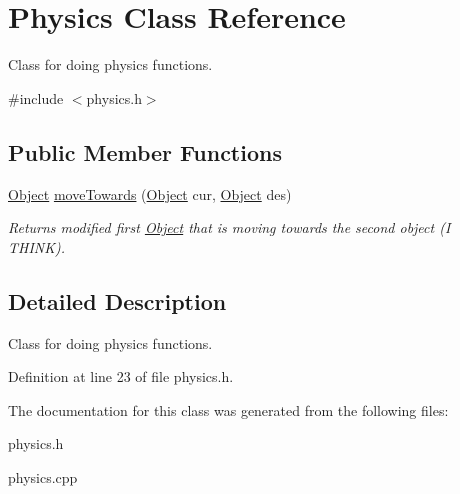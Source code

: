 \hypertarget{classPhysics}{}\section{Physics Class Reference}
\label{classPhysics}


Class for doing physics functions.  




{\ttfamily \#include $<$physics.\+h$>$}

\subsection*{Public Member Functions}
\begin{DoxyCompactItemize}
\item 
\hyperlink{classObject}{Object} \hyperlink{classPhysics_a8e53f9bf088c0d4f208b3c2029d69ab2}{move\+Towards} (\hyperlink{classObject}{Object} cur, \hyperlink{classObject}{Object} des)\hypertarget{classPhysics_a8e53f9bf088c0d4f208b3c2029d69ab2}{}\label{classPhysics_a8e53f9bf088c0d4f208b3c2029d69ab2}

\begin{DoxyCompactList}\small\item\em Returns modified first \hyperlink{classObject}{Object} that is moving towards the second object (I T\+H\+I\+NK). \end{DoxyCompactList}\end{DoxyCompactItemize}


\subsection{Detailed Description}
Class for doing physics functions. 

Definition at line 23 of file physics.\+h.



The documentation for this class was generated from the following files\+:\begin{DoxyCompactItemize}
\item 
physics.\+h\item 
physics.\+cpp\end{DoxyCompactItemize}
